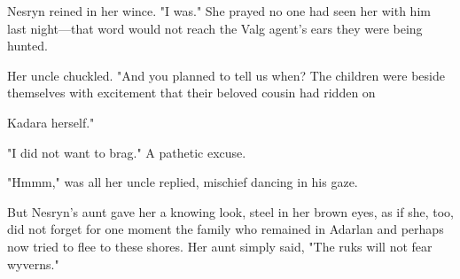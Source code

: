 Nesryn reined in her wince. "I  was." She prayed no one had seen her with him last night---that word would not reach the Valg agent's ears they were being hunted.

Her uncle chuckled. "And you planned to tell us when? The children were beside themselves with excitement that their beloved cousin had ridden on

Kadara herself."

"I did not want to brag." A pathetic excuse.

"Hmmm," was all her uncle replied, mischief dancing in his gaze.

But Nesryn's aunt gave her a knowing look, steel in her brown eyes, as if she, too, did not forget for one moment the family who remained in Adarlan and perhaps now tried to flee to these shores. Her aunt simply said, "The ruks will not fear wyverns."

